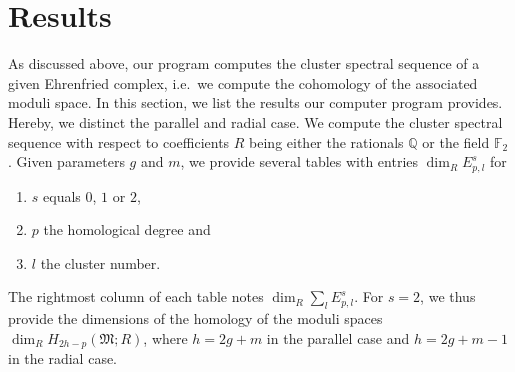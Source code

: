 \section{Results}
\label{program:results}

As discussed above, our program computes the cluster spectral sequence of a given Ehrenfried complex, i.e.\ we compute the cohomology of the associated moduli space.
In this section, we list the results our computer program provides.
Hereby, we distinct the parallel and radial case.
We compute the cluster spectral sequence with respect to coefficients $R$ being either the rationals $\mathbb Q$ or the field $\mathbb F_2$.
Given parameters $g$ and $m$, we provide several tables with entries $\dim_R E^s_{p,l}$ for
\begin{enumerate}
    \item $s$ equals $0$, $1$ or $2$,
    \item $p$ the homological degree and
    \item $l$ the cluster number.
\end{enumerate}
The rightmost column of each table notes $\dim_R \sum_{l} E^s_{p,l}$.
For $s=2$, we thus provide the dimensions of the homology of the moduli spaces $\dim_R H_{2h-p}(\mathfrak M;R)$,
where $h = 2g+m$ in the parallel case and $h = 2g + m -1$ in the radial case.


